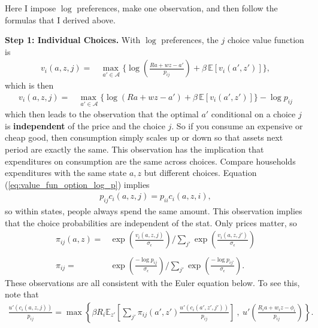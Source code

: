 \documentclass[12pt,pdftex]{article}
\begin{document}
\begin{onehalfspacing}
Here I impose $\log$ preferences, make one observation, and then follow the formulas that I derived above.

\textbf{Step 1: Individual Choices.} With $\log$ preferences, the $j$ choice value function is
\begin{align}
v_{i}(a, z, j) = &  \max_{\ a' \in \mathcal{A} }\bigg  \{ \log\left (\frac{Ra + wz - a'}{p_{ij}} \right )  + \beta \, \mathbb{E} [v_{i}(a', z')]  \bigg\},
\end{align}
which is then
\begin{align}
v_{i}(a, z, j) = &  \max_{\ a' \in \mathcal{A} }\bigg  \{ \log(Ra + wz - a' )  + \beta \, \mathbb{E} [v_{i}(a', z' )]  \bigg\} - \log p_{ij}
\label{eq:value_fun_option_log_p}
\end{align}
which then leads to the observation that the optimal $a'$ conditional on a choice $j$ is \textbf{independent} of the price and the choice $j$. So if you consume an expensive or cheap good, then consumption simply scales up or down so that assets next period are exactly the same. This observation has the implication that expenditures on consumption are the same across choices. Compare households expenditures with the same state $a,z$ but different choices. Equation (\ref{eq:value_fun_option_log_p}) implies
\begin{align}
p_{ij}c_{i}(a,z,j) = p_{ii}c_{i}(a,z,i),
\label{eq:apx-same-spending}
\end{align}
so within states, people always spend the same amount. This observation implies that the choice probabilities are independent of the stat. Only prices matter, so
\begin{align}
\pi_{ij}(a, z) = & \exp \left( \frac{ v_{i}(a, z, j) }{\sigma_{\epsilon}} \right) \Bigg / \sum_{j'} \exp \left( \frac{ v_{i}(a, z, j' ) }{\sigma_{\epsilon}} \right) \\
\nonumber\\
\pi_{ij} = & \exp \left( \frac{  -\log p_{ij} }{\sigma_{\epsilon}} \right) \Bigg / \sum_{j'} \exp \left( \frac{ -\log p_{ij'} }{\sigma_{\epsilon}} \right). \label{apx-eq:shares}
\end{align}
These observations are all consistent with the Euler equation below. To see this, note that
\begin{align}
\frac{u'(c_{i}(a, z, j))}{p_{ij}} = \max \left\{ \beta R_{i} \mathbb{E}_{z'} \left[ \sum_{j'} \pi_{ij}(a', z') \frac{u'(c_{i}(a', z', j'))}{p_{ij}} \right] \ , \  u' \left( \frac{R_i a + w_i z - \phi_{i}}{p_{ij}} \right) \right \}.
\end{align}

\end{onehalfspacing}
\end{document}
